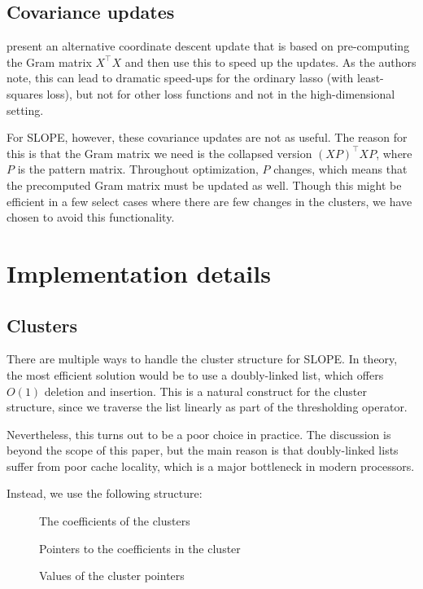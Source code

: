\documentclass[article]{jss}
\begin{document}
\subsection{Covariance updates}

\citet{friedman2010} present an alternative coordinate descent update that is
based on pre-computing the Gram matrix \(X^\intercal X\) and then use this to
speed up the updates. As the authors note, this can lead to dramatic speed-ups
for the ordinary lasso (with least-squares loss), but not for other loss
functions and not in the high-dimensional setting.

For SLOPE, however, these covariance updates are not as useful. The
reason for this is that the Gram matrix we need is the collapsed
version \((XP)^\intercal XP\), where \(P\) is the pattern matrix.
Throughout optimization, \(P\) changes, which means that the
precomputed Gram matrix must be updated as well. Though this
might be efficient in a few select cases where there are few
changes in the clusters, we have chosen to avoid this
functionality.

\section{Implementation details}

\subsection{Clusters}

There are multiple ways to handle the cluster structure for SLOPE.
In theory, the most efficient solution would be to use a
doubly-linked list, which offers \(O(1)\) deletion and insertion.
This is a natural construct for the cluster structure, since we
traverse the list linearly as part of the thresholding operator.

Nevertheless, this turns out to be a poor choice in practice.
The discussion is beyond the scope of this paper, but the main
reason is that doubly-linked lists suffer from poor cache
locality, which is a major bottleneck in modern processors.

Instead, we use the following structure:

\begin{description}
  \item[] The coefficients of the clusters
  \item[] Pointers to the coefficients in the cluster
  \item[] Values of the cluster pointers
\end{description}
\end{document}
